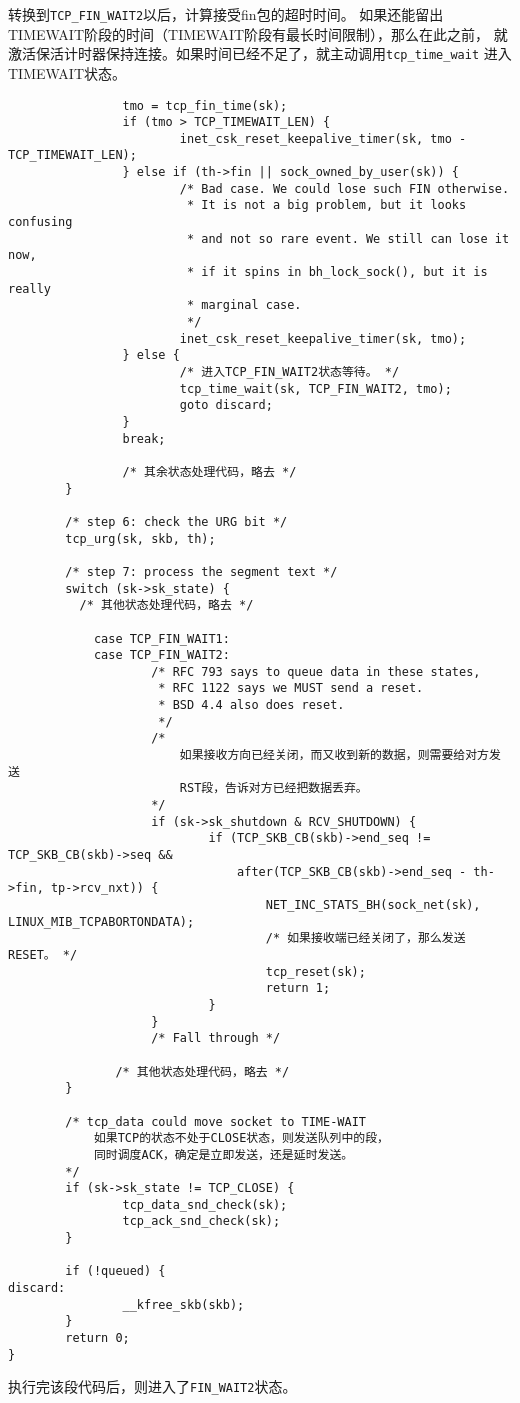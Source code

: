 	转换到\texttt{TCP_FIN_WAIT2}以后，计算接受fin包的超时时间。
	如果还能留出TIMEWAIT阶段的时间（TIMEWAIT阶段有最长时间限制），那么在此之前，
	就激活保活计时器保持连接。如果时间已经不足了，就主动调用\texttt{tcp_time_wait}
	进入TIMEWAIT状态。
\begin{verbatim}
                tmo = tcp_fin_time(sk);
                if (tmo > TCP_TIMEWAIT_LEN) {
                        inet_csk_reset_keepalive_timer(sk, tmo - TCP_TIMEWAIT_LEN);
                } else if (th->fin || sock_owned_by_user(sk)) {
                        /* Bad case. We could lose such FIN otherwise.
                         * It is not a big problem, but it looks confusing
                         * and not so rare event. We still can lose it now,
                         * if it spins in bh_lock_sock(), but it is really
                         * marginal case.
                         */
                        inet_csk_reset_keepalive_timer(sk, tmo);
                } else {
                        /* 进入TCP_FIN_WAIT2状态等待。 */
                        tcp_time_wait(sk, TCP_FIN_WAIT2, tmo);
                        goto discard;
                }
                break;

                /* 其余状态处理代码，略去 */
        }

        /* step 6: check the URG bit */
        tcp_urg(sk, skb, th);

        /* step 7: process the segment text */
        switch (sk->sk_state) {
          /* 其他状态处理代码，略去 */

		    case TCP_FIN_WAIT1:
		    case TCP_FIN_WAIT2:
		            /* RFC 793 says to queue data in these states,
		             * RFC 1122 says we MUST send a reset.
		             * BSD 4.4 also does reset.
		             */
					/*
						如果接收方向已经关闭，而又收到新的数据，则需要给对方发送
						RST段，告诉对方已经把数据丢弃。
					*/
		            if (sk->sk_shutdown & RCV_SHUTDOWN) {
		                    if (TCP_SKB_CB(skb)->end_seq != TCP_SKB_CB(skb)->seq &&
		                        after(TCP_SKB_CB(skb)->end_seq - th->fin, tp->rcv_nxt)) {
		                            NET_INC_STATS_BH(sock_net(sk), LINUX_MIB_TCPABORTONDATA);
		                            /* 如果接收端已经关闭了，那么发送RESET。 */
		                            tcp_reset(sk);
		                            return 1;
		                    }
		            }
		            /* Fall through */

		       /* 其他状态处理代码，略去 */
        }

        /* tcp_data could move socket to TIME-WAIT 
			如果TCP的状态不处于CLOSE状态，则发送队列中的段，
			同时调度ACK，确定是立即发送，还是延时发送。
		*/
        if (sk->sk_state != TCP_CLOSE) {
                tcp_data_snd_check(sk);
                tcp_ack_snd_check(sk);
        }

        if (!queued) {
discard:
                __kfree_skb(skb);
        }
        return 0;
}
\end{verbatim}
	执行完该段代码后，则进入了\texttt{FIN_WAIT2}状态。

